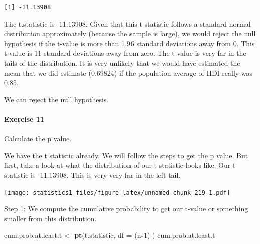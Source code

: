 \documentclass[]{article}
\newenvironment{Shaded}{\begin{snugshade}}{\end{snugshade}}
\newcommand{\KeywordTok}[1]{\textcolor[rgb]{0.13,0.29,0.53}{\textbf{#1}}}
\newcommand{\DataTypeTok}[1]{\textcolor[rgb]{0.13,0.29,0.53}{#1}}
\newcommand{\DecValTok}[1]{\textcolor[rgb]{0.00,0.00,0.81}{#1}}
\newcommand{\FloatTok}[1]{\textcolor[rgb]{0.00,0.00,0.81}{#1}}
\newcommand{\StringTok}[1]{\textcolor[rgb]{0.31,0.60,0.02}{#1}}
\newcommand{\OperatorTok}[1]{\textcolor[rgb]{0.81,0.36,0.00}{\textbf{#1}}}
\newcommand{\NormalTok}[1]{#1}
\let\oldparagraph\paragraph
\renewcommand{\paragraph}[1]{\oldparagraph{#1}\mbox{}}
\theoremstyle{definition}
\theoremstyle{definition}
\theoremstyle{definition}
\theoremstyle{remark}
\begin{document}
\begin{Shaded}
\end{Shaded}

\begin{verbatim}
[1] -11.13908
\end{verbatim}

The t.statistic is -11.13908. Given that this t statistic follows a
standard normal distribution approximately (because the sample is
large), we would reject the null hypothesis if the t-value is more than
1.96 standard deviations away from 0. This t-value is 11 standard
deviations away from zero. The t-value is very far in the tails of the
distribution. It is very unlikely that we would have estimated the mean
that we did estimate (0.69824) if the population average of HDI really
was 0.85.

We can reject the null hypothesis.

\paragraph{Exercise 11}\label{exercise-11-1}

Calculate the p value.

We have the t statistic already. We will follow the steps to get the p
value. But first, take a look at what the distribution of our t
statistic looks like. Our t statistic is -11.13908. This is very very
far in the left tail.

\texttt{[image: statistics1\_files/figure-latex/unnamed-chunk-219-1.pdf]}

Step 1: We compute the cumulative probability to get our t-value or
something smaller from this distribution.

\begin{Shaded}
\begin{Highlighting}[]
\NormalTok{cum.prob.at.least.t <-}\StringTok{ }\KeywordTok{pt}\NormalTok{(t.statistic, }\DataTypeTok{df =}\NormalTok{ (n}\OperatorTok{-}\DecValTok{1}\NormalTok{) )}
\NormalTok{cum.prob.at.least.t}
\end{Highlighting}
\end{Shaded}
\end{document}

